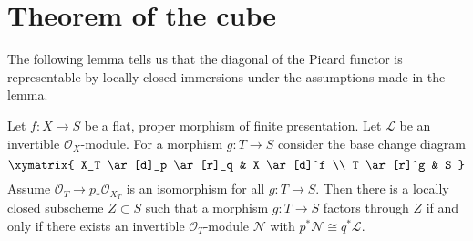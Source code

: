 \section{Theorem of the cube}
\label{section-theorem-cube}

\noindent
The following lemma tells us that the diagonal of the Picard
functor is representable by locally closed immersions under
the assumptions made in the lemma.

\begin{lemma}
\label{lemma-diagonal-picard-flat-proper}
Let $f : X \to S$ be a flat, proper morphism of finite presentation.
Let $\mathcal{L}$ be an invertible $\mathcal{O}_X$-module.
For a morphism $g : T \to S$ consider the base change diagram
$$
\xymatrix{
X_T \ar[d]_p \ar[r]_q & X \ar[d]^f \\
T \ar[r]^g & S
}
$$
Assume $\mathcal{O}_T \to p_*\mathcal{O}_{X_T}$ is an
isomorphism for all $g : T \to S$.
Then there is a locally closed subscheme $Z \subset S$ such that
a morphism $g : T \to S$ factors through $Z$ if and only if
there exists an invertible $\mathcal{O}_T$-module $\mathcal{N}$
with $p^*\mathcal{N} \cong q^*\mathcal{L}$.
\end{lemma}

